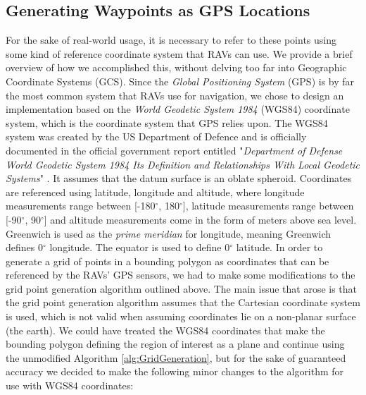 \subsection{Generating Waypoints as GPS Locations}
For the sake of real-world usage, it is necessary to refer to these points using some kind of reference coordinate system that RAVs can use. We provide a brief overview of how we accomplished this, without delving too far into Geographic Coordinate Systems (GCS). Since the \textit{Global Positioning System} (GPS) is by far the most common system that RAVs use for navigation, we chose to design an implementation based on the \textit{World Geodetic System 1984} (WGS84) coordinate system, which is the coordinate system that GPS relies upon. The WGS84 system was created by the US Department of Defence and is officially documented in the official government report entitled "\textit{Department of Defense World Geodetic System 1984 Its Definition and Relationships With Local Geodetic Systems}" \cite{ReportpreparedbytheDMAWGS84DevelopmentCommittee1991Department1984}. It assumes that the datum surface is an oblate spheroid.
Coordinates are referenced using latitude, longitude and altitude, where longitude measurements range between [-180$^{\circ}$, 180$^{\circ}$], latitude measurements range between [-90$^{\circ}$, 90$^{\circ}$] and altitude measurements come in the form of meters above sea level. Greenwich is used as the \textit{prime meridian} for longitude, meaning Greenwich defines 0$^{\circ}$ longitude. The equator is used to define 0$^{\circ}$ latitude. In order to generate a grid of points in a bounding polygon as coordinates that can be referenced by the RAVs' GPS sensors, we had to make some modifications to the grid point generation algorithm outlined above. The main issue that arose is that the grid point generation algorithm assumes that the Cartesian coordinate system is used, which is not valid when assuming coordinates lie on a  non-planar surface (the earth). We could have treated the WGS84 coordinates that make the bounding polygon defining the region of interest as a plane and continue using the unmodified Algorithm \ref{alg:GridGeneration}, but for the sake of guaranteed accuracy we decided to make the following minor changes to the algorithm for use with WGS84 coordinates:
